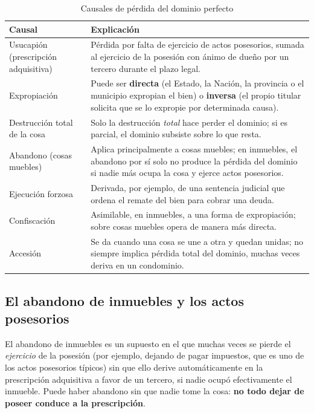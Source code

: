 \documentclass[12pt,oneside]{book}
\begin{document}
\begin{table}[H]
\centering
\caption{Causales de pérdida del dominio perfecto}
\renewcommand{\arraystretch}{1.25}
\begin{tabularx}{\textwidth}{
    >{\raggedright\arraybackslash}p{}
    >{\raggedright\arraybackslash}X
}
\toprule
\textbf{Causal} & \textbf{Explicación} \\
\midrule
Usucapión (prescripción adquisitiva) & Pérdida por falta de ejercicio de actos posesorios, sumada al ejercicio de la posesión con ánimo de dueño por un tercero durante el plazo legal. \\
Expropiación & Puede ser \textbf{directa} (el Estado, la Nación, la provincia o el municipio expropian el bien) o \textbf{inversa} (el propio titular solicita que se lo expropie por determinada causa). \\
Destrucción total de la cosa & Solo la destrucción \emph{total} hace perder el dominio; si es parcial, el dominio subsiste sobre lo que resta. \\
Abandono (cosas muebles) & Aplica principalmente a cosas muebles; en inmuebles, el abandono por sí solo no produce la pérdida del dominio si nadie más ocupa la cosa y ejerce actos posesorios. \\
Ejecución forzosa & Derivada, por ejemplo, de una sentencia judicial que ordena el remate del bien para cobrar una deuda. \\
Confiscación & Asimilable, en inmuebles, a una forma de expropiación; sobre cosas muebles opera de manera más directa. \\
Accesión & Se da cuando una cosa se une a otra y quedan unidas; no siempre implica pérdida total del dominio, muchas veces deriva en un condominio. \\
\bottomrule
\end{tabularx}
\end{table}

\subsection{El abandono de inmuebles y los actos posesorios}

El abandono de inmuebles es un supuesto en el que muchas veces se pierde el \emph{ejercicio} de la posesión (por ejemplo, dejando de pagar impuestos, que es uno de los actos posesorios típicos) sin que ello derive automáticamente en la prescripción adquisitiva a favor de un tercero, si nadie ocupó efectivamente el inmueble. Puede haber abandono sin que nadie tome la cosa: \textbf{no todo dejar de poseer conduce a la prescripción}.
\end{document}
